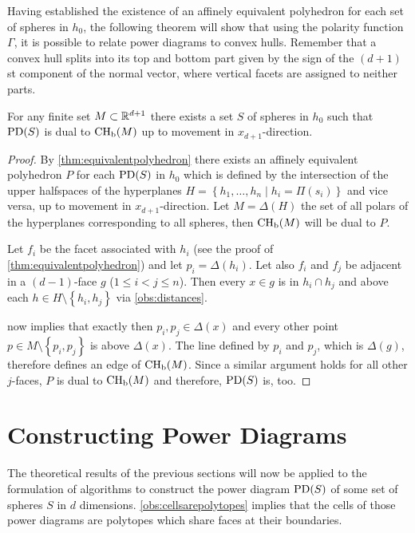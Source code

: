 Having established the existence of an affinely equivalent polyhedron for each set of spheres in $h_0$, the following theorem will show that using the polarity function $\Gamma$, it is possible to relate power diagrams to convex hulls.
Remember that a convex hull splits into its top and bottom part given by the sign of the $(d+1)$st component of the normal vector, where vertical facets are assigned to neither parts.
\begin{theorem}
    \label{thm:equivalentconvexhull}
    For any finite set $M \subset \mathbb{R}^{d+1}$ there exists a set $S$ of spheres in $h_0$ such that $\operatorname{PD}(S)$ is dual to $\operatorname{CH_b}(M)$ up to movement in $x_{d+1}$-direction.
\end{theorem}
\begin{proof}
    By \cref{thm:equivalentpolyhedron} there exists an affinely equivalent polyhedron $P$ for each $\operatorname{PD}(S)$ in $h_0$ which is defined by the intersection of the upper halfspaces of the hyperplanes $H = \left\{ h_1, \dots, h_n \mid h_i = \Pi(s_i) \right\}$ and vice versa, up to movement in $x_{d+1}$-direction.
    Let $M = \Delta(H)$ the set of all polars of the hyperplanes corresponding to all spheres, then $\operatorname{CH_b}(M)$ will be dual to $P$.

    Let $f_i$ be the facet associated with $h_i$ (see the proof of \cref{thm:equivalentpolyhedron}) and let $p_i = \Delta(h_i)$.
    Let also $f_i$ and $f_j$ be adjacent in a $(d-1)$-face $g$ ($1 \leq i < j \leq n$).
    Then every $x \in g$ is in $h_i \cap h_j$ and above each $h \in H \setminus \left\{ h_i, h_j \right\}$ via \cref{obs:distances}.

     now implies that exactly then $p_i, p_j \in \Delta(x)$ and every other point $p \in M \setminus \left\{ p_i, p_j \right\}$ is above $\Delta(x)$.
    The line defined by $p_i$ and $p_j$, which is $\Delta(g)$, therefore defines an edge of $\operatorname{CH_b}(M)$.
    Since a similar argument holds for all other $j$-faces, $P$ is dual to $\operatorname{CH_b}(M)$ and therefore, $\operatorname{PD}(S)$ is, too.
\end{proof}

\section{Constructing Power Diagrams}
\label{sec:constructing_power_diagrams}
The theoretical results of the previous sections will now be applied to the formulation of algorithms to construct the power diagram $\operatorname{PD}(S)$ of some set of spheres $S$ in $d$ dimensions.
\cref{obs:cellsarepolytopes} implies that the cells of those power diagrams are polytopes which share faces at their boundaries.

